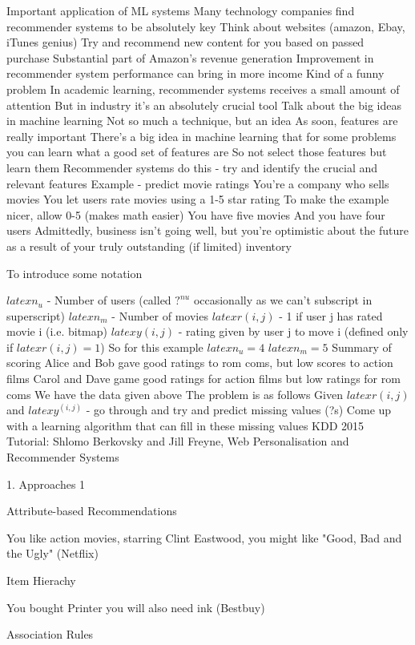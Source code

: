Important application of ML systems
Many technology companies find recommender systems to be absolutely key
Think about websites (amazon, Ebay, iTunes genius)
Try and recommend new content for you based on passed purchase
Substantial part of Amazon's revenue generation
Improvement in recommender system performance can bring in more income
Kind of a funny problem
In academic learning, recommender systems receives a small amount of attention
But in industry it's an absolutely crucial tool
Talk about the big ideas in machine learning
Not so much a technique, but an idea
As soon, features are really important
There's a big idea in machine learning that for some problems you can learn what a good set of features are
So not select those features but learn them
Recommender systems do this - try and identify the crucial and relevant features
Example - predict movie ratings
You're a company who sells movies
You let users rate movies using a 1-5 star rating
To make the example nicer, allow 0-5 (makes math easier)
You have five movies
And you have four users
Admittedly, business isn't going well, but you're optimistic about the future as a result of your truly outstanding (if limited) inventory

To introduce some notation

$latex n_u$ - Number of users (called $?^{nu}$ occasionally as we can't subscript in superscript)
$latex n_m$ - Number of movies
$latex r(i, j)$ - 1 if user j has rated movie i (i.e. bitmap)
$latex y(i,j)$ - rating given by user j to move i (defined only if $latex r(i,j) = 1$)
So for this example
$latex n_u = 4$
$latex n_m = 5$
Summary of scoring
Alice and Bob gave good ratings to rom coms, but low scores to action films
Carol and Dave game good ratings for action films but low ratings for rom coms
We have the data given above
The problem is as follows
Given $latex r(i,j)$ and $latex y^{(i,j)}$ - go through and try and predict missing values (?s)
Come up with a learning algorithm that can fill in these missing values
KDD 2015 Tutorial: Shlomo Berkovsky and Jill Freyne, Web Personalisation and Recommender Systems

1. Approaches 1


Attribute-based Recommendations

You like action movies, starring Clint Eastwood, you might like "Good, Bad and the Ugly" (Netflix)

Item Hierachy

You bought Printer you will also need ink (Bestbuy)

Association Rules

